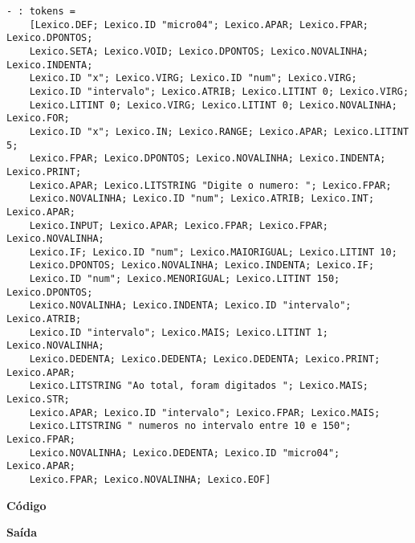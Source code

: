 \documentclass[hidelinks,12pt]{article}
\begin{document}
	\begin{lstlisting}[caption=Analisador Léxico]
	- : tokens =
	[Lexico.DEF; Lexico.ID "micro04"; Lexico.APAR; Lexico.FPAR; Lexico.DPONTOS;
	Lexico.SETA; Lexico.VOID; Lexico.DPONTOS; Lexico.NOVALINHA; Lexico.INDENTA;
	Lexico.ID "x"; Lexico.VIRG; Lexico.ID "num"; Lexico.VIRG;
	Lexico.ID "intervalo"; Lexico.ATRIB; Lexico.LITINT 0; Lexico.VIRG;
	Lexico.LITINT 0; Lexico.VIRG; Lexico.LITINT 0; Lexico.NOVALINHA; Lexico.FOR;
	Lexico.ID "x"; Lexico.IN; Lexico.RANGE; Lexico.APAR; Lexico.LITINT 5;
	Lexico.FPAR; Lexico.DPONTOS; Lexico.NOVALINHA; Lexico.INDENTA; Lexico.PRINT;
	Lexico.APAR; Lexico.LITSTRING "Digite o numero: "; Lexico.FPAR;
	Lexico.NOVALINHA; Lexico.ID "num"; Lexico.ATRIB; Lexico.INT; Lexico.APAR;
	Lexico.INPUT; Lexico.APAR; Lexico.FPAR; Lexico.FPAR; Lexico.NOVALINHA;
	Lexico.IF; Lexico.ID "num"; Lexico.MAIORIGUAL; Lexico.LITINT 10;
	Lexico.DPONTOS; Lexico.NOVALINHA; Lexico.INDENTA; Lexico.IF;
	Lexico.ID "num"; Lexico.MENORIGUAL; Lexico.LITINT 150; Lexico.DPONTOS;
	Lexico.NOVALINHA; Lexico.INDENTA; Lexico.ID "intervalo"; Lexico.ATRIB;
	Lexico.ID "intervalo"; Lexico.MAIS; Lexico.LITINT 1; Lexico.NOVALINHA;
	Lexico.DEDENTA; Lexico.DEDENTA; Lexico.DEDENTA; Lexico.PRINT; Lexico.APAR;
	Lexico.LITSTRING "Ao total, foram digitados "; Lexico.MAIS; Lexico.STR;
	Lexico.APAR; Lexico.ID "intervalo"; Lexico.FPAR; Lexico.MAIS;
	Lexico.LITSTRING " numeros no intervalo entre 10 e 150"; Lexico.FPAR;
	Lexico.NOVALINHA; Lexico.DEDENTA; Lexico.ID "micro04"; Lexico.APAR;
	Lexico.FPAR; Lexico.NOVALINHA; Lexico.EOF]
	\end{lstlisting}
	
	
	{\large \textbf{Código} }
			
	
	{\large \textbf{Saída}}
	
\end{document}
